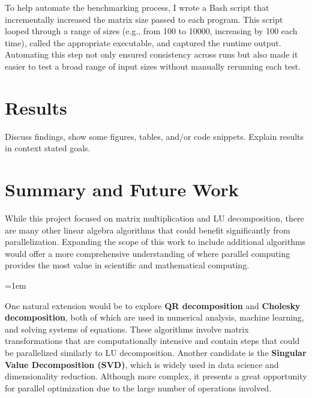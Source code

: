 \documentclass[12pt]{article}
\begin{document}
To help automate the benchmarking process, I wrote a Bash script that incrementally increased the matrix size passed to each program. This script looped
through a range of sizes (e.g., from 100 to 10000, increasing by 100 each time), called the appropriate executable, and captured the runtime output.
Automating this step not only ensured consistency across runs but also made it easier to test a broad range of input sizes without manually rerunning
each test.

\section{Results}
Discuss findings, show some figures, tables, and/or code snippets.
Explain results in context stated goals.


\section{Summary and Future Work}
While this project focused on matrix multiplication and LU decomposition, there are many other linear algebra algorithms that could benefit significantly
from parallelization. Expanding the scope of this work to include additional algorithms would offer a more comprehensive understanding of where parallel
computing provides the most value in scientific and mathematical computing.

\parskip=1em

One natural extension would be to explore \textbf{QR decomposition} and \textbf{Cholesky decomposition}, both of which are used in numerical analysis,
machine learning, and solving systems of equations. These algorithms involve matrix transformations that are computationally intensive and contain
steps that could be parallelized similarly to LU decomposition. Another candidate is the \textbf{Singular Value Decomposition (SVD)}, which is widely
used in data science and dimensionality reduction. Although more complex, it presents a great opportunity for parallel optimization due to the large number
of operations involved.
\end{document}
